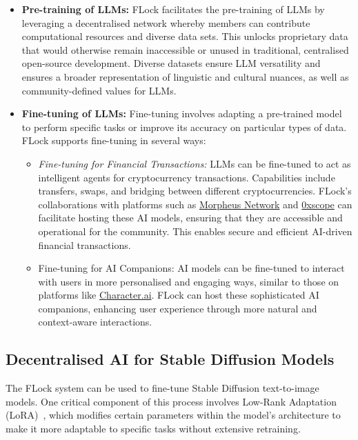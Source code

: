 \documentclass[conference]{IEEEtran}
\newcommand{\LLMs}{\acp{LLM}\xspace}
\begin{document}
\begin{itemize}
    \item \textbf{Pre-training of \LLMs:}
FLock facilitates the pre-training of \LLMs by leveraging a decentralised network whereby members can contribute computational resources and diverse data sets. This unlocks proprietary data that would otherwise remain inaccessible or unused in traditional, centralised open-source development. Diverse datasets ensure LLM versatility and ensures a broader representation of linguistic and cultural nuances, as well as community-defined values for \LLMs.
\item \textbf{Fine-tuning of LLMs:}
Fine-tuning involves adapting a pre-trained model to perform specific tasks or improve its accuracy on particular types of data. FLock supports fine-tuning in several ways:




\begin{itemize}
    \item \emph{Fine-tuning for Financial Transactions:} LLMs can be fine-tuned to act as intelligent agents for cryptocurrency transactions. Capabilities include transfers, swaps, and bridging between different cryptocurrencies. FLock's collaborations with platforms such as \href{https://morpheus.network/}{Morpheus Network} and \href{https://www.0xscope.com/}{0xscope} can facilitate hosting these AI models, ensuring that they are accessible and operational for the community. This enables secure and efficient AI-driven financial transactions.

 \item Fine-tuning for AI Companions: AI models can be fine-tuned to interact with users in more personalised and engaging ways, similar to those on platforms like \href{https://character.ai/}{Character.ai}. FLock can host these sophisticated AI companions, enhancing user experience through more natural and context-aware interactions.
\end{itemize}


\end{itemize}



\subsection{Decentralised AI for Stable Diffusion Models}
The FLock system can be used to fine-tune Stable Diffusion text-to-image models.  One critical component of this process involves Low-Rank Adaptation (LoRA)~\cite{hu2021lora}, which modifies certain parameters within the model's architecture to make it more adaptable to specific tasks without extensive retraining.
\end{document}
